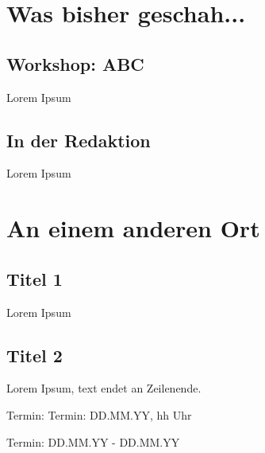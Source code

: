 
%



%


\multiauthor{}

\multidate{}

\multiausgabe{}

\multilosung{}

%



\makemultititle
%

\section{Was bisher geschah...}

\subsection{Workshop: ABC}
Lorem Ipsum

\subsection{In der Redaktion}
Lorem Ipsum

\section{An einem anderen Ort}

\subsection{Titel 1}
Lorem Ipsum

\subsection{Titel 2}
Lorem Ipsum, text endet an Zeilenende.


\begin{termine}
\item Termin: Termin: DD.MM.YY, hh Uhr
  \item Termin: DD.MM.YY - DD.MM.YY
\end{termine}


